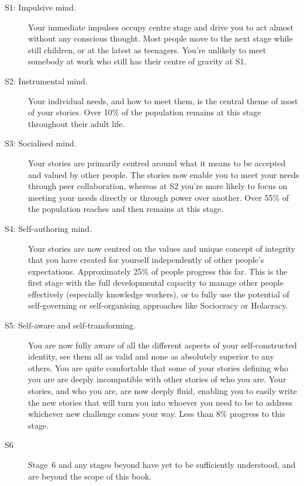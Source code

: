 \begin{description}
\item [S1: Impulsive mind.] Your immediate impulses occupy centre stage and drive you to act almost without any conscious thought. Most people move to the next stage while still children, or at the latest as teenagers. You're unlikely to meet somebody at work who still has their centre of gravity at S1.
\item [S2: Instrumental mind.] Your individual needs, and how to meet them, is the central theme of most of your stories. Over 10\% of the population remains at this stage throughout their adult life.
\item [S3: Socialised mind.] Your stories are primarily centred around what it means to be accepted and valued by other people. The stories now enable you to meet your needs through peer collaboration, whereas at S2 you're more likely to focus on meeting your needs directly or through power over another. Over 55\% of the population reaches and then remains at this stage.
\item [S4: Self-authoring mind.] Your stories are now centred on the values and unique concept of integrity that you have created for yourself independently of other people’s expectations. Approximately 25\% of people progress  this far. This is the first stage with the full developmental capacity to manage other people effectively (especially knowledge workers), or to fully use the potential of self-governing or self-organising approaches like Sociocracy or Holacracy.
\item [S5: Self-aware and self-transforming.] You are now fully aware of all the different aspects of your self-constructed identity, see them all as valid and none as absolutely superior to any others. You are quite comfortable that some of your stories defining who you are are deeply incompatible with other stories of who you are. Your stories, and who you are, are now deeply fluid, enabling you to easily write the new stories that will turn you into whoever you need to be to address whichever new challenge comes your way. Less than 8\% progress to this stage.
\item [S6] Stage~6 and any stages beyond have yet to be sufficiently understood, and are beyond the scope of this book.
\end{description}




